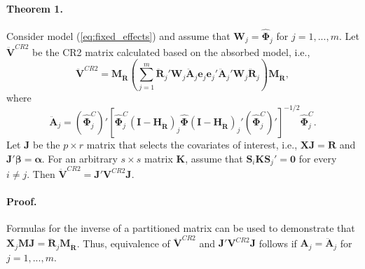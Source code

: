 \documentclass[12pt]{article}\usepackage[]{graphicx}\usepackage[]{color}
\newcommand{\bm}{\mathbf}
\newcommand{\bs}{\boldsymbol}
\begin{document}
\paragraph{Theorem 1.} Consider model (\ref{eq:fixed_effects}) and assume that $\bm{W}_j = \bs{\hat\Phi}_j$ for $j = 1,...,m$. Let $\bm{\ddot{V}}^{CR2}$ be the CR2 matrix calculated based on the absorbed model, i.e., 
\[
\bm{\ddot{V}}^{CR2} = \bm{M_{\ddot{R}}}\left(\sum_{j=1}^m \bm{\ddot{R}}_j'\bm{W}_j \bm{\ddot{A}}_j \bm{e}_j \bm{e}_j' \bm{\ddot{A}}_j' \bm{W}_j \bm{\ddot{R}}_j\right) \bm{M_{\ddot{R}}},
\]
where \[
\bm{\ddot{A}}_j = \left(\hat{\bs\Phi}_j^C\right)' \left[\hat{\bs\Phi}_j^C\left(\bm{I} - \bm{H_{\ddot{R}}}\right)_j \hat{\bs\Phi} \left(\bm{I} - \bm{H_{\ddot{R}}}\right)_j' \left(\hat{\bs\Phi}_j^C\right)' \right]^{-1/2}\hat{\bs\Phi}_j^C. \]
Let $\bm{J}$ be the $p \times r$ matrix that selects the covariates of interest, i.e., $\bm{X}\bm{J} = \bm{R}$ and $\bm{J}'\bs\beta = \bs\alpha$. 
For an arbitrary $s \times s$ matrix $\bm{K}$, assume that $\bm{S}_i \bm{K}\bm{S}_j' = \bm{0}$ for every $i \neq j$. Then $\bm{\ddot{V}}^{CR2} = \bm{J}'\bm{V}^{CR2}\bm{J}$.

\paragraph{Proof.} Formulas for the inverse of a partitioned matrix can be used to demonstrate that $\bm{X}_j\bm{M}\bm{J} = \bm{\ddot{R}}_j \bm{M_{\ddot{R}}}$. Thus, equivalence of $\bm{\ddot{V}}^{CR2}$ and $\bm{J}'\bm{V}^{CR2}\bm{J}$ follows if $\bm{A}_j = \bm{\ddot{A}}_j$ for $j = 1,...,m$.




\end{document}
